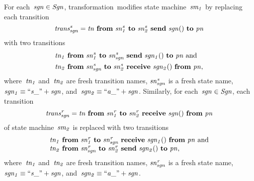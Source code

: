 For each~$\it{sgn} \in \it{Sgn}$,
transformation~\TSim modifies state machine~$\it{sm_1}$ by replacing each transition
%
\[
\it{trans^s_{sgn}} = \it{tn}\ \textbf{from}\ \it{sn^s_1}\ \textbf{to}\ \it{sn^s_2}\ \textbf{send}\ \it{sgn}()\ \textbf{to}\ \it{pn}
\]
%
with two transitions
%
\begin{align*}
& \it{tn_1}\ \textbf{from}\ \it{sn^s_1}\ \textbf{to}\ \it{sn^s_{sgn}}\ \textbf{send}\ \it{sgn_1}()\ \textbf{to}\ \it{pn}\ \text{and}\\
& \it{tn_2}\ \textbf{from}\ \it{sn^s_{sgn}}\ \textbf{to}\ \it{sn^s_2}\ \textbf{receive}\ \it{sgn_2}()\ \textbf{from}\ \it{pn},
\end{align*}
%
where~$\it{tn_1}$ and~$\it{tn_2}$ are fresh transition names, $\it{sn^s_{sgn}}$ is a fresh state name, $\it{sgn_1} \equiv ``s\_" + \it{sgn}$, and~$\it{sgn_2} \equiv ``a\_" + \it{sgn}$.
Similarly, for each~$\it{sgn} \in \it{Sgn}$,
each transition
%
\[
\it{trans^r_{sgn}} = \it{tn}\ \textbf{from}\ \it{sn^r_1}\ \textbf{to}\ \it{sn^r_2}\ \textbf{receive}\ \it{sgn}()\ \textbf{from}\ \it{pn}
\]
%
of state machine~$\it{sm_2}$ is replaced with two transitions
%
\[
\begin{array}{l}
\it{tn_1}\ \textbf{from}\ \it{sn^r_1}\ \textbf{to}\ \it{sn^r_{sgn}}\ \textbf{receive}\ \it{sgn_1}()\ \textbf{from}\ \it{pn}\ \text{and}\\
\it{tn_2}\ \textbf{from}\ \it{sn^r_{sgn}}\ \textbf{to}\ \it{sn^r_2}\ \textbf{send}\ \it{sgn_2}()\ \textbf{to}\ \it{pn},
\end{array}
\]
%
where~$\it{tn_1}$ and~$\it{tn_2}$ are fresh transition names, $\it{sn^r_{sgn}}$ is a fresh state name, $\it{sgn_1} \equiv ``s\_" + \it{sgn}$, and~$\it{sgn_2} \equiv ``a\_" + \it{sgn}$.

